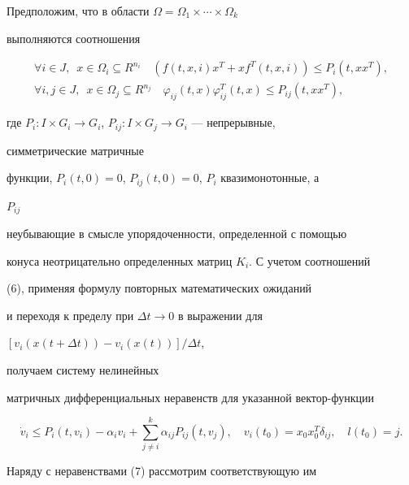  


Предположим, что в области $\Omega=\Omega_1\times\dotsb\times\Omega_k$ 


выполняются соотношения 


\begin{equation} 


\begin{array}{c} 


\forall i\in J,\ \; x\in\Omega_i\subseteq R^{n_i}\quad 


(f(t,x,i)x^T+x f^T(t,x,i))\le P_i(t,x x^T),\\[2mm] 


\forall i,j\in J,\ \; x\in \Omega_j\subseteq R^{n_j}\quad 


\varphi_{ij}(t,x)\varphi^T_{ij}(t,x)\le P_{ij}(t,x x^T), 


\end{array} 


\end{equation} 


где $P_i:I\times G_i\to G_i$, $P_{ij}:I\times G_j\to G_i$ --- непрерывные, 


симметрические матричные 


функции, $P_i(t,0)=0$, $P_{ij}(t,0)=0$, $P_i$ квазимонотонные, а 


$P_{ij}$ 


неубывающие в смысле упорядоченности, определенной с помощью  


конуса неотрицательно определенных матриц $K_i$. С учетом соотношений 


(6), применяя формулу повторных математических ожиданий 


и переходя к пределу при $\Delta t\to0$ в выражении для  


$[v_i(x(t+\Delta t))-v_i(x(t))]/\Delta t$, 


получаем систему нелинейных  


матричных дифференциальных неравенств для указанной вектор-функции 


\begin{equation} 


\Dot v_i\le P_i(t,v_i)-\alpha_i v_i+\sum^k_{j\ne i}\alpha_{ij} 


P_{ij}(t,v_j),\quad v_i(t_0)=x_0x^T_0\delta_{ij},\quad 


l(t_0)=j. 


\end{equation} 


Наряду с неравенствами (7) рассмотрим соответствующую им 



